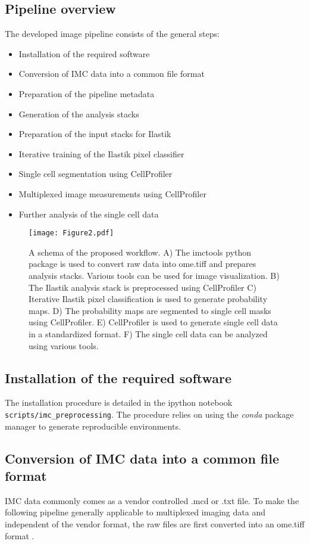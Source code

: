 \documentclass[a4paper]{article}
\begin{document}
\subsection{Pipeline overview}
The developed image pipeline consists of the general steps:
\begin{itemize}
\item Installation of the required software
\item Conversion of IMC data into a common file format
\item Preparation of the pipeline metadata
\item Generation of the analysis stacks 
\item Preparation of the input stacks for Ilastik
\item Iterative training of the Ilastik pixel classifier
\item Single cell segmentation using CellProfiler
\item Multiplexed image measurements using CellProfiler
\item Further analysis of the single cell data
\end{itemize}

\begin{figure}[htb]
\centering
\texttt{[image: Figure2.pdf]}
\caption{
A schema of the proposed workflow. A) The imctools python package is
used to convert raw data into ome.tiff and prepares analysis stacks. Various tools can be used for
image visualization. B) The Ilastik analysis stack is preprocessed using CellProfiler C) Iterative Ilastik pixel classification is
used to generate probability maps. D) The probability maps are segmented to single cell masks using
CellProfiler. E) CellProfiler is used to generate single cell data in a standardized format. F) The
single cell data can be analyzed using various tools.
\label{fig:pipeline}
}
\end{figure}

\subsection{Installation of the required software}
The installation procedure is detailed in the ipython notebook  \texttt{scripts/imc\_preprocessing}.
The procedure relies on using the \textit{conda} package manager to generate reproducible environments.

\subsection{Conversion of IMC data into a common file format}
IMC data commonly comes as a vendor controlled .mcd or .txt file. To make the following pipeline
generally applicable to multiplexed imaging data and independent of the vendor format, the raw
files are first converted into an ome.tiff format \cite{goldberg_open_2005}.
\end{document}
